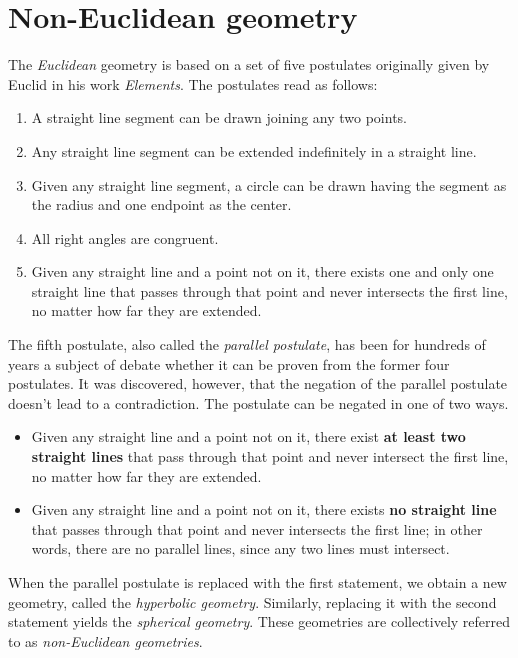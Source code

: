 \section{Non-Euclidean geometry}

The \textit{Euclidean} geometry is based on a set of five postulates originally given by Euclid in his work \textit{Elements}.
The postulates read as follows:
\begin{enumerate}
    \item A straight line segment can be drawn joining any two points.
    \item Any straight line segment can be extended indefinitely in a straight line.
    \item Given any straight line segment, a circle can be drawn having the segment as the radius and one endpoint as the center.
    \item All right angles are congruent.
    \item Given any straight line and a point not on it, there exists one and only one straight line that passes through that point and never intersects the first line, no matter how far they are extended.
\end{enumerate}
The fifth postulate, also called the \textit{parallel postulate}, has been for hundreds of years a subject of debate whether it can be proven from the former four postulates.
It was discovered, however, that the negation of the parallel postulate doesn't lead to a contradiction.
The postulate can be negated in one of two ways.
\begin{itemize}
    \item Given any straight line and a point not on it, there exist \textbf{at least two straight lines} that pass through that point and never intersect the first line, no matter how far they are extended.
    \item Given any straight line and a point not on it, there exists \textbf{no straight line} that passes through that point and never intersects the first line; in other words, there are no parallel lines, since any two lines must intersect.
\end{itemize}

When the parallel postulate is replaced with the first statement, we obtain a new geometry, called the \textit{hyperbolic geometry}.
Similarly, replacing it with the second statement yields the \textit{spherical geometry}.
These geometries are collectively referred to as \textit{non-Euclidean geometries}.



